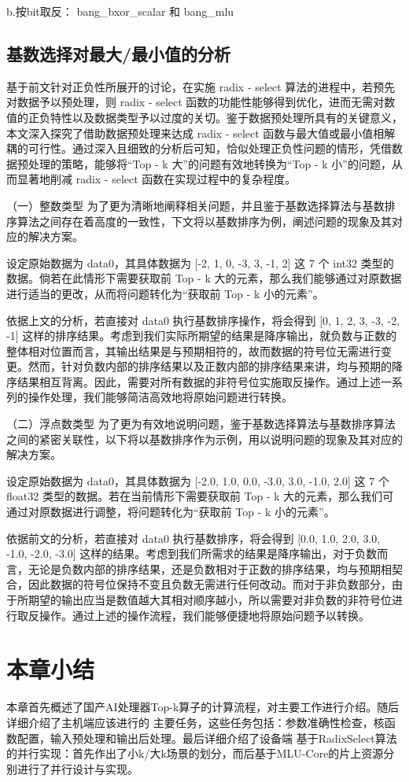 b.按bit取反： bang\_bxor\_scalar 和 bang\_mlu

\subsection{基数选择对最大/最小值的分析}
基于前文针对正负性所展开的讨论，在实施 radix - select 算法的进程中，若预先对数据予以预处理，则 radix - select 函数的功能性能够得到优化，进而无需对数值的正负特性以及数据类型予以过度的关切。鉴于数据预处理所具有的关键意义，本文深入探究了借助数据预处理来达成 radix - select 函数与最大值或最小值相解耦的可行性。通过深入且细致的分析后可知，恰似处理正负性问题的情形，凭借数据预处理的策略，能够将“Top - k 大”的问题有效地转换为“Top - k 小”的问题，从而显著地削减 radix - select 函数在实现过程中的复杂程度。

（一）整数类型
为了更为清晰地阐释相关问题，并且鉴于基数选择算法与基数排序算法之间存在着高度的一致性，下文将以基数排序为例，阐述问题的现象及其对应的解决方案。

设定原始数据为 data0，其具体数据为 [-2, 1, 0, -3, 3, -1, 2] 这 7 个 int32 类型的数据。倘若在此情形下需要获取前 Top - k 大的元素，那么我们能够通过对原数据进行适当的更改，从而将问题转化为“获取前 Top - k 小的元素”。

依据上文的分析，若直接对 data0 执行基数排序操作，将会得到 [0, 1, 2, 3, -3, -2, -1] 这样的排序结果。考虑到我们实际所期望的结果是降序输出，就负数与正数的整体相对位置而言，其输出结果是与预期相符的，故而数据的符号位无需进行变更。然而，针对负数内部的排序结果以及正数内部的排序结果来讲，均与预期的降序结果相互背离。因此，需要对所有数据的非符号位实施取反操作。通过上述一系列的操作处理，我们能够简洁高效地将原始问题进行转换。

（二）浮点数类型
为了更为有效地说明问题，鉴于基数选择算法与基数排序算法之间的紧密关联性，以下将以基数排序作为示例，用以说明问题的现象及其对应的解决方案。

设定原始数据为 data0，其具体数据为 [-2.0, 1.0, 0.0, -3.0, 3.0, -1.0, 2.0] 这 7 个 float32 类型的数据。若在当前情形下需要获取前 Top - k 大的元素，那么我们可通过对原数据进行调整，将问题转化为“获取前 Top - k 小的元素”。

依据前文的分析，若直接对 data0 执行基数排序，将会得到 [0.0, 1.0, 2.0, 3.0, -1.0, -2.0, -3.0] 这样的结果。考虑到我们所需求的结果是降序输出，对于负数而言，无论是负数内部的排序结果，还是负数相对于正数的排序结果，均与预期相契合，因此数据的符号位保持不变且负数无需进行任何改动。而对于非负数部分，由于所期望的输出应当是数值越大其相对顺序越小，所以需要对非负数的非符号位进行取反操作。通过上述的操作流程，我们能够便捷地将原始问题予以转换。 



\section{本章小结}
本章首先概述了国产AI处理器Top-k算子的计算流程，对主要工作进行介绍。随后详细介绍了主机端应该进行的
主要任务，这些任务包括：参数准确性检查，核函数配置，输入预处理和输出后处理。最后详细介绍了设备端
基于RadixSelect算法的并行实现：首先作出了小k/大k场景的划分，而后基于MLU-Core的片上资源分别进行了并行设计与实现。